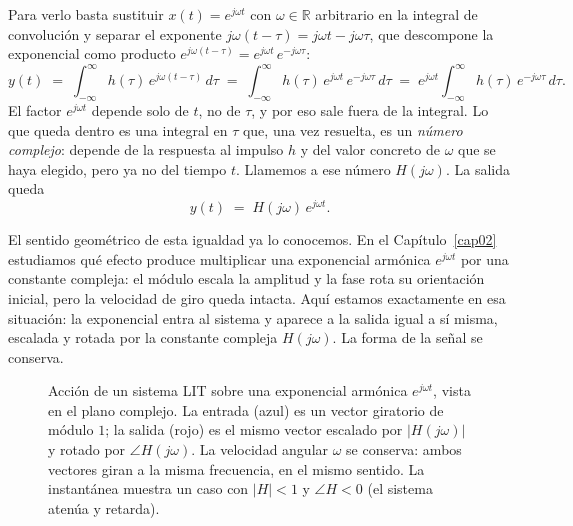 \documentclass[class=book, crop=false]{standalone}
\begin{document}
Para verlo basta sustituir $x(t) = e^{j\omega t}$ con $\omega \in \mathbb{R}$ arbitrario en la integral de convolución y separar el exponente $j\omega(t - \tau) = j\omega t - j\omega\tau$, que descompone la exponencial como producto $e^{j\omega(t-\tau)} = e^{j\omega t}\,e^{-j\omega\tau}$:
\begin{equation*}
    y(t) \;=\; \int_{-\infty}^{\infty} h(\tau)\,e^{j\omega(t-\tau)}\,d\tau
         \;=\; \int_{-\infty}^{\infty} h(\tau)\,e^{j\omega t}\,e^{-j\omega\tau}\,d\tau
         \;=\; e^{j\omega t}\int_{-\infty}^{\infty} h(\tau)\,e^{-j\omega\tau}\,d\tau.
\end{equation*}
El factor $e^{j\omega t}$ depende solo de $t$, no de $\tau$, y por eso sale fuera de la integral. Lo que queda dentro es una integral en $\tau$ que, una vez resuelta, es un \emph{número complejo}: depende de la respuesta al impulso $h$ y del valor concreto de $\omega$ que se haya elegido, pero ya no del tiempo $t$. Llamemos a ese número $H(j\omega)$. La salida queda
\begin{equation}
    y(t) \;=\; H(j\omega)\,e^{j\omega t}.
    \label{eq:funcion_propia}
\end{equation}

El sentido geométrico de esta igualdad ya lo conocemos. En el Capítulo~\ref{cap02} estudiamos qué efecto produce multiplicar una exponencial armónica $e^{j\omega t}$ por una constante compleja: el módulo escala la amplitud y la fase rota su orientación inicial, pero la velocidad de giro queda intacta. Aquí estamos exactamente en esa situación: la exponencial entra al sistema y aparece a la salida igual a sí misma, escalada y rotada por la constante compleja $H(j\omega)$. La forma de la señal se conserva.

\begin{figure}[H]
    \centering
    \begin{minipage}{\linewidth}
        \centering
        
        \caption{Acción de un sistema LIT sobre una exponencial armónica $e^{j\omega t}$, vista en el plano complejo. La entrada (azul) es un vector giratorio de módulo $1$; la salida (rojo) es el mismo vector escalado por $|H(j\omega)|$ y rotado por $\angle H(j\omega)$. La velocidad angular $\omega$ se conserva: ambos vectores giran a la misma frecuencia, en el mismo sentido. La instantánea muestra un caso con $|H| < 1$ y $\angle H < 0$ (el sistema atenúa y retarda).}
        \label{fig:lit_vector_giratorio}
    \end{minipage}
\end{figure}
\end{document}
